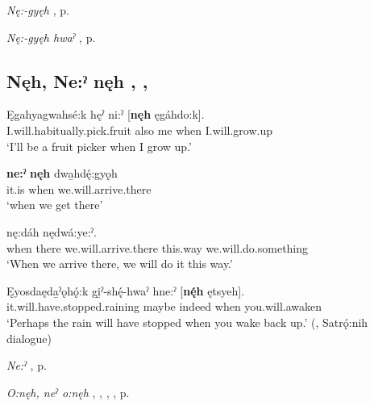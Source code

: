 \begin{CayugaRelated}
\item \textit{Nę:-gyęh} , p. \pageref{p:[nę:-gyęh]}\\
\item \textit{Nę:-gyęh hwaˀ} , p. \pageref{p:[nę:-gyęh hwaˀ] ‘this time’}
\end{CayugaRelated}


\subsection*{\textbf{Nęh, Ne:ˀ nęh} , , } \label{p:[nęh, ne:ˀ nęh]}

\ea
\label{ex:npar122}
\gll Ęgahyagwahsé:k hęˀ ni:ˀ [\textbf{nęh} ęgáhdo:k]. \\
I.will.habitually.pick.fruit also me when I.will.grow.up\\
\glt ‘I’ll be a fruit picker when I grow up.’
\z

\ea
\label{ex:npar123}
\gll \textbf{ne:ˀ} \textbf{nęh} dwa̱hdę́:gyǫh \\
it.is when we.will.arrive.there\\
\glt ‘when we get there’
\z

\ea
\label{ex:npar124}
 nę:dáh nędwá:ye:ˀ. \\
when there we.will.arrive.there this.way we.will.do.something\\
\glt ‘When we arrive there, we will do it this way.’
\z

\ea
\label{ex:npar125}
\gll Ęyosdaęda̱ˀǫhǫ́:k gi̱ˀ-shę́-hwaˀ hne:ˀ [\textbf{nę́h} ętsyeh]. \\
it.will.have.stopped.raining maybe indeed when you.will.awaken\\
\glt ‘Perhaps the rain will have stopped when you wake back up.’ (\cite[212]{mithun_watewayestanih_1984}, Satrǫ́:nih dialogue)
\z

\begin{CayugaRelated}
\item \textit{Ne:ˀ} , p. \pageref{p:[ne:ˀ] `it is’}\\
\item \textit{O:nęh, neˀ o:nęh} , , , , p. \pageref{p:[o:nęh]}
\end{CayugaRelated}


